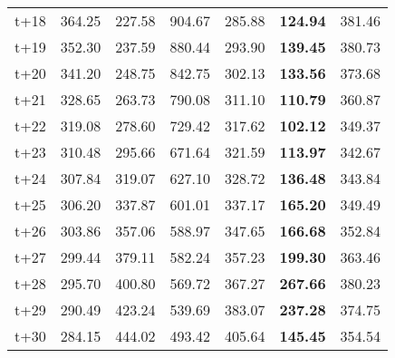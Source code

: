 \begin{table}[H]
\begin{tabular}{lrrrrrr}
t+18  & 364.25  & 227.58  & 904.67  & 285.88  & \textbf{124.94}  & 381.46  \\
t+19  & 352.30  & 237.59  & 880.44  & 293.90  & \textbf{139.45}  & 380.73  \\
t+20  & 341.20  & 248.75  & 842.75  & 302.13  & \textbf{133.56}  & 373.68  \\
t+21  & 328.65  & 263.73  & 790.08  & 311.10  & \textbf{110.79}  & 360.87  \\
t+22  & 319.08  & 278.60  & 729.42  & 317.62  & \textbf{102.12}  & 349.37  \\
t+23  & 310.48  & 295.66  & 671.64  & 321.59  & \textbf{113.97}  & 342.67  \\
t+24  & 307.84  & 319.07  & 627.10  & 328.72  & \textbf{136.48}  & 343.84  \\
t+25  & 306.20  & 337.87  & 601.01  & 337.17  & \textbf{165.20}  & 349.49  \\
t+26  & 303.86  & 357.06  & 588.97  & 347.65  & \textbf{166.68}  & 352.84  \\
t+27  & 299.44  & 379.11  & 582.24  & 357.23  & \textbf{199.30}  & 363.46  \\
t+28  & 295.70  & 400.80  & 569.72  & 367.27  & \textbf{267.66}  & 380.23  \\
t+29  & 290.49  & 423.24  & 539.69  & 383.07  & \textbf{237.28}  & 374.75  \\
t+30  & 284.15  & 444.02  & 493.42  & 405.64  & \textbf{145.45}  & 354.54  \\

\bottomrule
\end{tabular}
\end{table}
